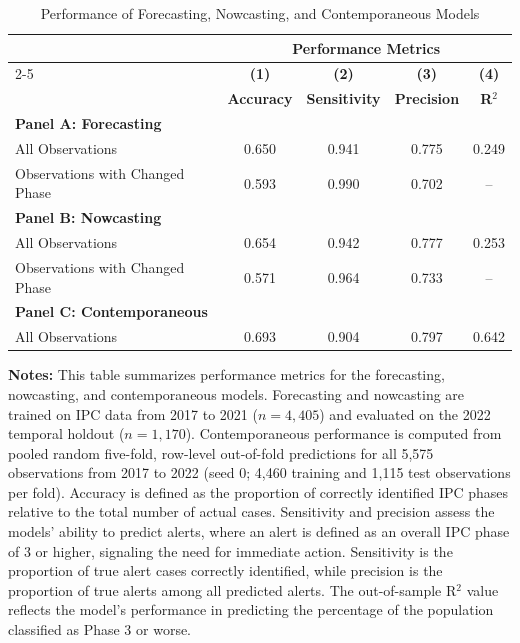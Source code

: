 \documentclass[pdflatex,sn-mathphys-num]{sn-jnl}%
\theoremstyle{thmstyleone}%
\theoremstyle{thmstyletwo}%
\theoremstyle{thmstylethree}%
\begin{document}
\clearpage
\newpage
\setcounter{table}{0}

\begin{table}[htbp]
\centering

\caption{Performance of Forecasting, Nowcasting, and Contemporaneous Models}
\label{tab:performance}

\begin{footnotesize}
\begin{tabular}{lcccc}
\toprule
\multicolumn{1}{c}{} & \multicolumn{4}{c}{\textbf{Performance Metrics}} \\
\cmidrule(lr){2-5}
 & \textbf{(1)} & \textbf{(2)} & \textbf{(3)} & \textbf{(4)} \\
 & \textbf{Accuracy} & \textbf{Sensitivity} & \textbf{Precision} & \textbf{R$^2$} \\
\midrule

\textbf{Panel A: Forecasting} & & & & \\
All Observations & 0.650 & 0.941 & 0.775 & 0.249 \\
Observations with Changed Phase & 0.593 & 0.990 & 0.702 & -- \\

\midrule

\textbf{Panel B: Nowcasting} & & & & \\
All Observations & 0.654 & 0.942 & 0.777 & 0.253 \\
Observations with Changed Phase & 0.571 & 0.964 & 0.733 & -- \\

\midrule

\textbf{Panel C: Contemporaneous} & & & & \\
All Observations & 0.693 & 0.904 & 0.797 & 0.642 \\

\bottomrule
\end{tabular}
\end{footnotesize}

\vspace{0.3cm}

\begin{minipage}{0.95\textwidth}
\footnotesize

\textbf{Notes:}
This table summarizes performance metrics for the forecasting, nowcasting, and contemporaneous models. Forecasting and nowcasting are trained on IPC data from 2017 to 2021 ($n=4{,}405$) and evaluated on the 2022 temporal holdout ($n=1{,}170$). Contemporaneous performance is computed from pooled random five-fold, row-level out-of-fold predictions for all 5,575 observations from 2017 to 2022 (seed 0; 4,460 training and 1,115 test observations per fold). Accuracy is defined as the proportion of correctly identified IPC phases relative to the total number of actual cases. Sensitivity and precision assess the models' ability to predict alerts, where an alert is defined as an overall IPC phase of 3 or higher, signaling the need for immediate action. Sensitivity is the proportion of true alert cases correctly identified, while precision is the proportion of true alerts among all predicted alerts. The out-of-sample R$^{2}$ value reflects the model's performance in predicting the percentage of the population classified as Phase 3 or worse.


\end{minipage}
\end{table}
\end{document}
